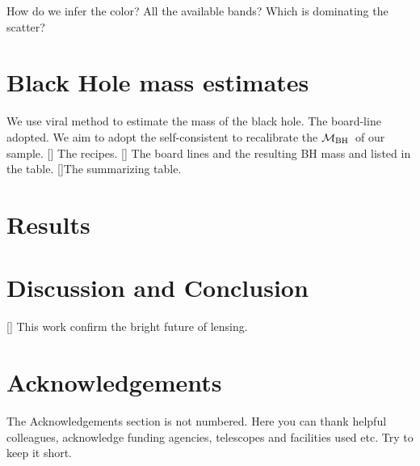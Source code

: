 \documentclass[fleqn,usenatbib]{mnras}
\newcommand{\mbh}{$\mathcal M_{\rm BH}$}
\newcommand{\ding}[1]{\textcolor{red}{[{\bf Xuheng}: #1]}}
\begin{document}
How do we infer the color? All the available bands? Which is dominating the scatter?

\section{Black Hole mass estimates}
We use viral method to estimate the mass of the black hole. The board-line adopted. We aim to adopt the self-consistent to recalibrate the \mbh~of our sample. 
[] The recipes. [] The board lines and the resulting BH mass and listed in the table. []The summarizing table.

\section{Results}



\section{Discussion and Conclusion}
[] This work confirm the bright future of lensing.



\section*{Acknowledgements}

The Acknowledgements section is not numbered. Here you can thank helpful
colleagues, acknowledge funding agencies, telescopes and facilities used etc.
Try to keep it short.







\end{document}
